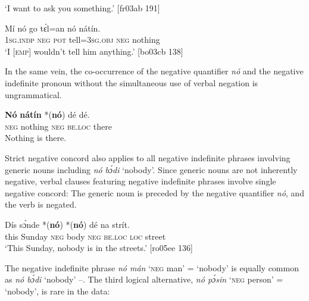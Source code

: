 \glt ‘I want to ask you something.’ [fr03ab 191]
\z


\z


\ea%
    \label{ex:key:559}
    \gll Mí    nó  go  tɛ́l=an    nó  nátín.\\
\textsc{1sg.indp}  \textsc{neg}  \textsc{pot}  tell=\textsc{3sg.obj}  \textsc{neg}  nothing\\

\glt ‘I \textsc{[emp]} wouldn’t tell him anything.’ [bo03cb 138]
\z

In the same vein, the co-occurrence of the negative quantifier \textit{nó} and the negative indefinite pronoun without the simultaneous use of verbal negation is ungrammatical. 


\ea%
    \label{ex:key:560}
    \gll \textbf{Nó}   \textbf{nátín}  *(\textbf{nó})  dé    dé.\\
\textsc{neg}  nothing  \textsc{neg}    \textsc{be.loc}  there\\

\glt *Nothing is there.
\z

Strict negative concord also applies to all negative indefinite phrases involving generic nouns including \textit{nó} \textit{bɔ́di} ‘nobody’. Since generic nouns are not inherently negative, verbal clauses featuring negative indefinite phrases involve single negative concord: The generic noun is preceded by the negative quantifier \textit{nó}, and the verb is negated. 


\ea%
    \label{ex:key:561}
    \gll Dís  sɔ́nde  *(\textbf{nó})    *(\textbf{nó})  dé    na  strít.\\
this  Sunday  \textsc{neg}    body  \textsc{neg}    \textsc{be.loc}  \textsc{loc}  street\\

\glt ‘This Sunday, nobody is in the streets.’ [ro05ee 136]
\z

The negative indefinite phrase \textit{nó mán} ‘\textsc{neg} man’ = ‘nobody’ is equally common as \textit{nó bɔ́di} ‘nobody’ –. The third logical alternative, \textit{nó pɔ́sin} ‘\textsc{neg} person’ = ‘nobody’, is rare in the data: 



